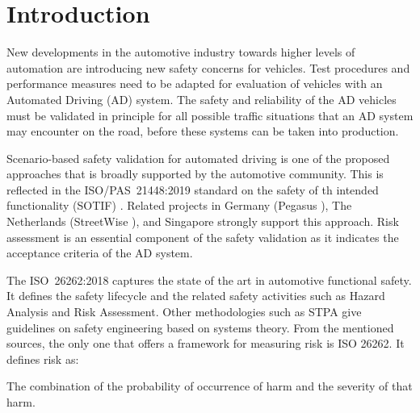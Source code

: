 \section{Introduction}
\label{sec:introduction}


New developments in the automotive industry towards higher levels of automation are introducing new safety concerns for vehicles. Test procedures and performance measures need to be adapted for evaluation of vehicles with an Automated Driving (AD) system. The safety and reliability of the AD vehicles must be validated in principle for all possible traffic situations that an AD system may encounter on the road, before these systems can be taken into production.

Scenario-based safety validation for automated driving is one of the proposed approaches that is broadly supported by the automotive community. This is reflected in the ISO/PAS~21448:2019 standard on the safety of th intended functionality (SOTIF) \cite{ISO21448}. Related projects in Germany (Pegasus \cite{putz2017pegasus}), The Netherlands (StreetWise \cite{elrofai2018scenario}), and Singapore \cite{ploeg2018cetran} strongly support this approach. Risk assessment is an essential component of the safety validation as it indicates the acceptance criteria of the AD system.

The ISO~26262:2018 \cite{ISO26262} captures the state of the art in automotive functional safety. It defines the safety lifecycle and the related safety activities such as Hazard Analysis and Risk Assessment. Other methodologies such as STPA \cite{leveson2013stpa} give guidelines on safety engineering based on systems theory. From the mentioned sources, the only one that offers a framework for measuring risk is ISO 26262. It defines risk as:
\begin{definition}
	The combination of the probability of occurrence of harm and the severity of that harm.
\end{definition}

